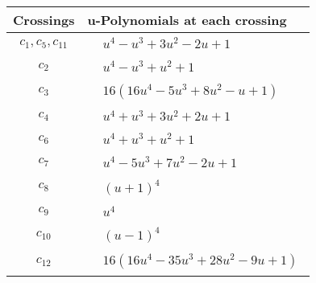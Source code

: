 \documentclass[1p]{elsarticle_modified}
\theoremstyle{definition}
\begin{document}
\begin{tabular}{m{50pt}|m{274pt}}
Crossings & \hspace{64pt}u-Polynomials at each crossing \\
\hline $$\begin{aligned}c_{1},c_{5},c_{11}\end{aligned}$$&$\begin{aligned}
&u^4- u^3+3 u^2-2 u+1
\end{aligned}$\\
\hline $$\begin{aligned}c_{2}\end{aligned}$$&$\begin{aligned}
&u^4- u^3+u^2+1
\end{aligned}$\\
\hline $$\begin{aligned}c_{3}\end{aligned}$$&$\begin{aligned}
&16(16 u^4-5 u^3+8 u^2- u+1)
\end{aligned}$\\
\hline $$\begin{aligned}c_{4}\end{aligned}$$&$\begin{aligned}
&u^4+u^3+3 u^2+2 u+1
\end{aligned}$\\
\hline $$\begin{aligned}c_{6}\end{aligned}$$&$\begin{aligned}
&u^4+u^3+u^2+1
\end{aligned}$\\
\hline $$\begin{aligned}c_{7}\end{aligned}$$&$\begin{aligned}
&u^4-5 u^3+7 u^2-2 u+1
\end{aligned}$\\
\hline $$\begin{aligned}c_{8}\end{aligned}$$&$\begin{aligned}
&(u+1)^4
\end{aligned}$\\
\hline $$\begin{aligned}c_{9}\end{aligned}$$&$\begin{aligned}
&u^4
\end{aligned}$\\
\hline $$\begin{aligned}c_{10}\end{aligned}$$&$\begin{aligned}
&(u-1)^4
\end{aligned}$\\
\hline $$\begin{aligned}c_{12}\end{aligned}$$&$\begin{aligned}
&16(16 u^4-35 u^3+28 u^2-9 u+1)
\end{aligned}$\\
\hline
\end{tabular}\\~\\
\end{document}
